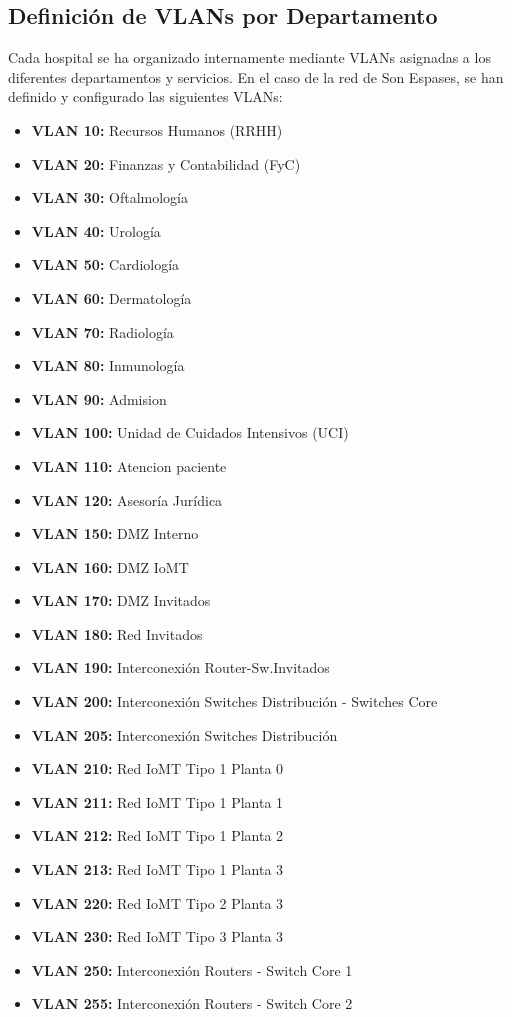 \subsection{Definición de VLANs por Departamento}
\label{subsec:VLANs}
Cada hospital se ha organizado internamente mediante VLANs asignadas a los diferentes departamentos y servicios. En el caso de la red de Son Espases, se han definido y configurado 
las siguientes VLANs: 
\begin{itemize}
    \item \textbf{VLAN 10:} Recursos Humanos (RRHH)
    \item \textbf{VLAN 20:} Finanzas y Contabilidad (FyC)
    \item \textbf{VLAN 30:} Oftalmología
    \item \textbf{VLAN 40:} Urología 
    \item \textbf{VLAN 50:} Cardiología
    \item \textbf{VLAN 60:} Dermatología 
    \item \textbf{VLAN 70:} Radiología 
    \item \textbf{VLAN 80:} Inmunología 
    \item \textbf{VLAN 90:} Admision
    \item \textbf{VLAN 100:} Unidad de Cuidados Intensivos (UCI)
    \item \textbf{VLAN 110:} Atencion paciente 
    \item \textbf{VLAN 120:} Asesoría Jurídica
    \item \textbf{VLAN 150:} DMZ Interno
    \item \textbf{VLAN 160:} DMZ IoMT
    \item \textbf{VLAN 170:} DMZ Invitados
    \item \textbf{VLAN 180:} Red Invitados
    \item \textbf{VLAN 190:} Interconexión Router-Sw.Invitados
    \item \textbf{VLAN 200:} Interconexión Switches Distribución - Switches Core
    \item \textbf{VLAN 205:} Interconexión Switches Distribución
    \item \textbf{VLAN 210:} Red IoMT Tipo 1 Planta 0
    \item \textbf{VLAN 211:} Red IoMT Tipo 1 Planta 1
    \item \textbf{VLAN 212:} Red IoMT Tipo 1 Planta 2
    \item \textbf{VLAN 213:} Red IoMT Tipo 1 Planta 3
    \item \textbf{VLAN 220:} Red IoMT Tipo 2 Planta 3
    \item \textbf{VLAN 230:} Red IoMT Tipo 3 Planta 3
    \item \textbf{VLAN 250:} Interconexión Routers - Switch Core 1
    \item \textbf{VLAN 255:} Interconexión Routers - Switch Core 2
\end{itemize}

